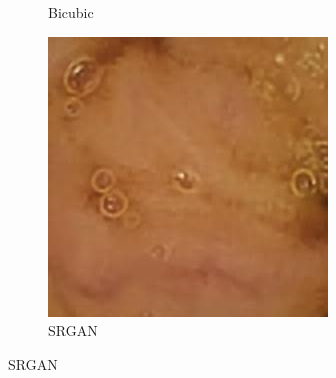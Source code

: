 \begin{figure}[H]
\begin{subfigure}[b]{0.275\textwidth}
    \caption{Bicubic}
  \end{subfigure}
  \begin{subfigure}[b]{0.275\textwidth}
    \includegraphics[width=\textwidth]{Chapter7/srgan_9.jpg}
    \caption{SRGAN}
  \end{subfigure}
  

\end{figure}
